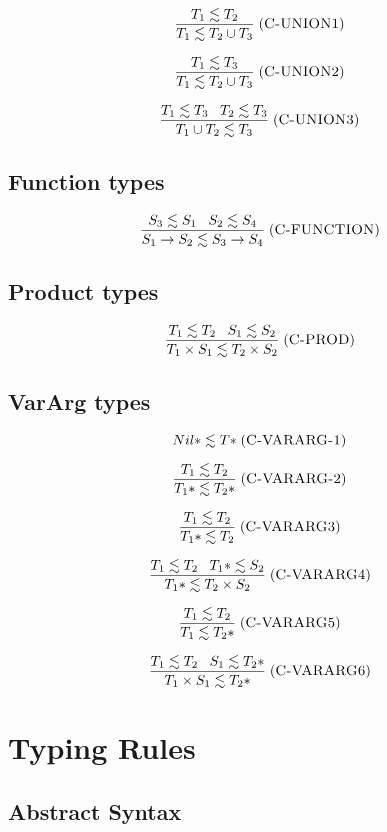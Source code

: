 \documentclass[12pt]{article}
\newcommand{\mylabel}[1]{\; (\textsc{#1})}
\begin{document}
\[
\frac{T_{1} \lesssim T_{2}}
     {T_{1} \lesssim T_{2} \cup T_{3}}
\mylabel{C-UNION1}
\]

\[
\frac{T_{1} \lesssim T_{3}}
     {T_{1} \lesssim T_{2} \cup T_{3}}
\mylabel{C-UNION2}
\]

\[
\frac{T_{1} \lesssim T_{3} \;\;\; T_{2} \lesssim T_{3}}
     {T_{1} \cup T_{2} \lesssim T_{3}}
\mylabel{C-UNION3}
\]

\subsection{Function types}

\[
\frac{S_{3} \lesssim S_{1} \;\;\; S_{2} \lesssim S_{4}}
     {S_{1} \rightarrow S_{2} \lesssim S_{3} \rightarrow S_{4}}
\mylabel{C-FUNCTION}
\]

\subsection{Product types}

\[
\frac{T_{1} \lesssim T_{2} \;\;\; S_{1} \lesssim S_{2}}
     {T_{1} \times S_{1} \lesssim T_{2} \times S_{2}}
\mylabel{C-PROD}
\]

\subsection{VarArg types}

\[
{Nil*} \lesssim {T*}
\mylabel{C-VARARG-1}
\]

\[
\frac{T_{1} \lesssim T_{2}}
     {{T_{1}*} \lesssim {T_{2}*}}
\mylabel{C-VARARG-2}
\]

\[
\frac{T_{1} \lesssim T_{2}}
     {{T_{1}*} \lesssim T_{2}}
\mylabel{C-VARARG3}
\]

\[
\frac{T_{1} \lesssim T_{2} \;\;\;
      {T_{1}*} \lesssim S_{2}}
     {{T_{1}*} \lesssim T_{2} \times S_{2}}
\mylabel{C-VARARG4}
\]

\[
\frac{T_{1} \lesssim T_{2}}
     {T_{1} \lesssim {T_{2}*}}
\mylabel{C-VARARG5}
\]

\[
\frac{T_{1} \lesssim T_{2} \;\;\;
      S_{1} \lesssim {T_{2}*}}
     {T_{1} \times S_{1} \lesssim {T_{2}*}}
\mylabel{C-VARARG6}
\]

\section{Typing Rules}

\subsection{Abstract Syntax}
\end{document}

